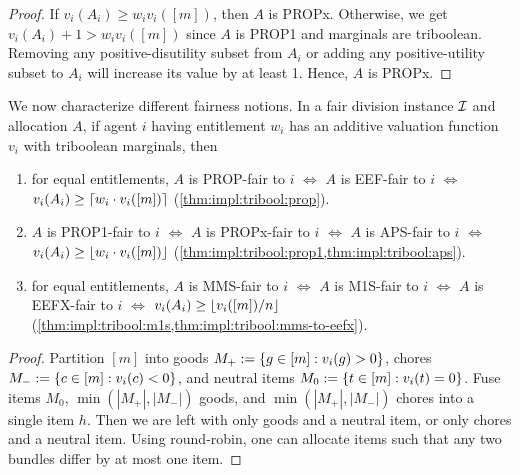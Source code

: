 \begin{proof}
If $v_i(A_i) \ge w_iv_i([m])$, then $A$ is PROPx.
Otherwise, we get $v_i(A_i) + 1 > w_iv_i([m])$ since $A$ is PROP1
and marginals are triboolean.
Removing any positive-disutility subset from $A_i$
or adding any positive-utility subset to $A_i$ will increase its value by at least 1.
Hence, $A$ is PROPx.
\end{proof}

We now characterize different fairness notions.
In a fair division instance $\mathcal{I}$ and allocation $A$, if agent $i$ having entitlement $w_i$
has an additive valuation function $v_i$ with triboolean marginals, then
\begin{enumerate}
\item for equal entitlements, $A$ is PROP-fair to $i$ $\iff$ $A$ is EEF-fair to $i$
    $\iff$ $v_i(A_i) \ge \lceil w_i \cdot v_i([m]) \rceil$ (\cref{thm:impl:tribool:prop}).
\item $A$ is PROP1-fair to $i$ $\iff$ $A$ is PROPx-fair to $i$ $\iff$ $A$ is APS-fair to $i$
    $\iff$ $v_i(A_i) \ge \lfloor w_i \cdot v_i([m]) \rfloor$ (\cref{thm:impl:tribool:prop1,thm:impl:tribool:aps}).
\item for equal entitlements, $A$ is MMS-fair to $i$ $\iff$ $A$ is M1S-fair to $i$ $\iff$ $A$ is EEFX-fair to $i$
    $\iff$ $v_i(A_i) \ge \lfloor v_i([m])/n \rfloor$ (\cref{thm:impl:tribool:m1s,thm:impl:tribool:mms-to-eefx}).
\end{enumerate}

\begin{proof}
Partition $[m]$ into
goods $M_+ := \{g \in [m]: v_i(g) > 0\}$,
chores $M_- := \{c \in [m]: v_i(c) < 0\}$,
and neutral items $M_0 := \{t \in [m]: v_i(t) = 0\}$.
Fuse items $M_0$, $\min(|M_+|, |M_-|)$ goods, and $\min(|M_+|, |M_-|)$ chores
into a single item $h$.
Then we are left with only goods and a neutral item,
or only chores and a neutral item.
Using round-robin, one can allocate items such that
any two bundles differ by at most one item.
\end{proof}

